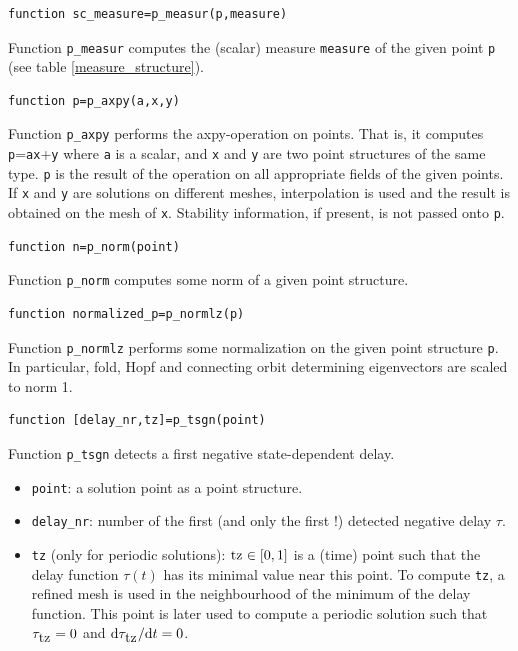 \documentclass[10pt]{scrartcl}
\renewcommand{\d}{\mathrm{d}}
\newcommand{\blist}[1]{\mbox{\lstinline!#1!}}
\begin{document}
{\begin{lstlisting}
function sc_measure=p_measur(p,measure)  
\end{lstlisting}
\noindent Function \blist{p_measur} computes the (scalar) measure
\blist{measure} of the given point \blist{p} (see table
\ref{measure_structure}).

\begin{lstlisting}
function p=p_axpy(a,x,y)  
\end{lstlisting}
\noindent Function \blist{p_axpy} performs the axpy-operation on
points. That is, it computes \blist{p}=\blist{a}\blist{x}+\blist{y} where 
\blist{a} is a scalar, and
\blist{x} and \blist{y} are two point structures of the same type.
\blist{p} is the result of the operation on all appropriate
fields of the given points.
If \blist{x} and \blist{y} are 
solutions on different meshes, interpolation
is used and the result is obtained on the mesh of \blist{x}.
Stability information, if present, is not passed onto \blist{p}.

\begin{lstlisting}
function n=p_norm(point)  
\end{lstlisting}
\noindent Function \blist{p_norm} computes some 
norm of a given point structure.

\begin{lstlisting}
function normalized_p=p_normlz(p)  
\end{lstlisting}
\noindent Function \blist{p_normlz} performs some normalization on the
given point structure \blist{p}. In particular, fold, Hopf and
connecting orbit determining eigenvectors are scaled to norm 1.

\begin{lstlisting}
function [delay_nr,tz]=p_tsgn(point)  
\end{lstlisting}
\noindent Function \blist{p_tsgn} detects a first negative state-dependent 
delay.
\begin{itemize}
\item \blist{point}: a solution point as a point structure.
\item \blist{delay_nr}: number of the first (and only the first !) 
detected negative delay $\tau$.
\item \blist{tz} (only for periodic solutions): $\blist{tz}\in [0,1]$ 
is a (time) point such that the delay function $\tau(t)$ has its 
minimal value near this point. To compute \blist{tz}, a refined mesh 
is used in the neighbourhood of the minimum of the delay function.
This point is later used to compute a periodic solution
such that $\tau_{\blist{tz}}=0$ and ${\d}\tau_{\blist{tz}}/{\d}t=0$. 
\end{itemize}

}
\end{document}
